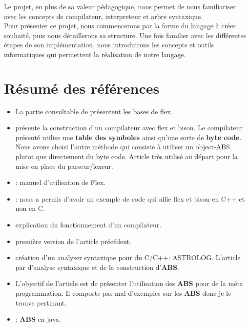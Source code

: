 \documentclass[a4paper]{article}%
\begin{document}
Le projet, en plus de sa valeur pédagogique, nous permet de nous familiariser avec les concepts de compilateur, interpreteur et arbre syntaxique.\\

Pour présenter ce projet, nous commencerons par la forme du langage à créer souhaité, puis nous détaillerons sa structure. Une fois familier avec les différentes étapes de son implémentation,  nous introduirons les concepts et outils informatiques qui permettent la réalisation de notre langage.\\

\normalsize
\clearpage{}


\section{Résumé des références}

\begin{itemize}
  \item La partie consultable de \cite{flexBisonHandbook} présentent les bases
    de flex.
  \item \cite{compilerFlexBison} présente la construction d'un compilateur avec
    flex et bison. Le compilateur présenté utilise une \textbf{table des
    symboles} ainsi qu'une sorte de \textbf{byte code}. Nous avons choisi
    l'autre méthode qui consiste à utiliser un object-ABS plutot que directement
    du byte code. Article très utilisé au départ pour la mise en place du
    parseur/lexeur.
  \item \cite{flexmanual}: manuel d'utilisation de Flex.
  \item \cite{cppparsing}: nous a permis d'avoir un exemple de code qui allie
    flex et bison en C++ et non en C.


  \item \cite{compilerTICH} explication du fonctionnement d'un compilateur.
  \item \cite{compilerTILB} première version de l'article précédent.
  \item \cite{crew1997astlog} création d'un analyser syntaxique pour du C/C++:
    ASTROLOG. L'article par d'analyse syntaxique et de la construction
    d'\textbf{ABS}.

  \item \cite{visser2002meta} L'objectif de l'article est de présenter
    l'utilisation des \textbf{ABS} pour de la méta programmation. Il comporte
    pas mal d'exemples sur les \textbf{ABS} donc je le trouve pertinant.
  \item \cite{gagnon1998sablecc}: \textbf{ABS} en java.
\end{itemize}
\end{document}
